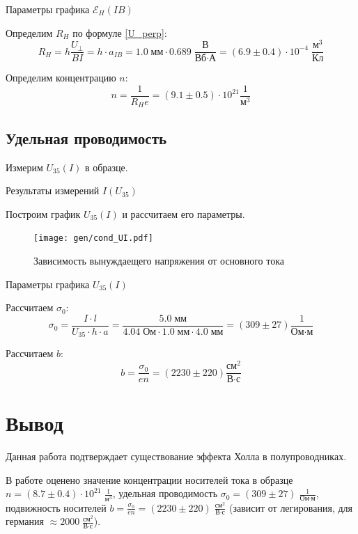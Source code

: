 \documentclass[12pt,a4paper]{article}
\begin{document}
	\begin{table}[h]
		\caption{Параметры графика $\mathcal{E}_H (IB)$}
		
	\end{table}

	Определим $R_H$ по формуле \eqref{U_perp}:
	$$ R_H = h \frac{U_\perp}{BI} = h \cdot a_{IB} = 1.0 \; \text{мм} \cdot 0.689 \; \frac{\text{В}}{\text{Вб} \cdot \text{А}} = (6.9 \pm 0.4) \cdot 10^{-4} \; \frac{\text{м}^3}{\text{Кл}} $$
	
	Определим концентрацию $n$:
	$$ n = \frac{1}{R_H e} = (9.1 \pm 0.5) \cdot 10^{21} \frac{1}{\text{м}^3} $$
	
	\subsection*{Удельная проводимость}
	
	Измерим $U_{35} (I)$ в образце.
	
	\begin{table}[h]
		\caption{Результаты измерений $I(U_{35})$}
		
	\end{table}
	
	Построим график $U_{35} (I)$ и рассчитаем его параметры.
	
	\begin{figure}[H]
		\texttt{[image: gen/cond\_UI.pdf]}
		\caption{Зависимость вынуждаещего напряжения от основного тока}
	\end{figure}
	
	\begin{table}[h]
		\caption{Параметры графика $U_{35} (I)$}
		
	\end{table}
	
	Рассчитаем $\sigma_0$:
	$$ \sigma_0 = \frac{I \cdot l}{U_{35} \cdot h \cdot a} = \frac{ 5.0 \; \text{мм} }{ 4.04 \; \text{Ом} \cdot 1.0 \; \text{мм} \cdot 4.0 \; \text{мм}} = (309 \pm 27) \frac{1}{\text{Ом} \cdot \text{м}} $$
	
	Рассчитаем $b$:
	$$ b = \frac{\sigma_0}{e n} = (2230 \pm 220) \frac{\text{см}^2}{\text{В} \cdot \text{с}} $$
	
	\section*{Вывод}
	
	Данная работа подтверждает существование эффекта Холла в полупроводниках.
	
	В работе оценено значение концентрации носителей тока в образце $ n = (8.7 \pm 0.4) \cdot 10^{21} \; \frac{1}{\text{м}^3} $, удельная проводимость $ \sigma_0 = (309 \pm 27) \; \frac{1}{\text{Ом} \cdot \text{м}} $, подвижность носителей $ b = \frac{\sigma_0}{e n} = (2230 \pm 220) \; \frac{\text{см}^2}{\text{В} \cdot \text{с}} $ (зависит от легирования, для германия $\approx 2000 \; \frac{\text{см}^2}{\text{В} \cdot \text{с}}$). 
	
\end{document}
